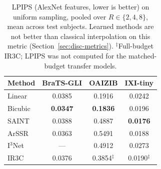 \begin{table}[pos=!htbp]
\caption{LPIPS (AlexNet features, lower is better) on uniform sampling, pooled over $R\in\{2,4,8\}$, mean across test subjects. Learned methods are not better than classical interpolation on this metric (Section~\ref{sec:disc-metrics}). $^{\ddagger}$Full-budget IR3C; LPIPS was not computed for the matched-budget transfer models.}
\label{tab:lpips}
\footnotesize\setlength{\tabcolsep}{3pt}
\begin{tabular*}{\columnwidth}{@{\extracolsep{\fill}}lccc@{}}
\toprule
Method & BraTS-GLI & OAIZIB & IXI-tiny \\
\midrule
Linear & 0.0385 & 0.1916 & 0.0242 \\
Bicubic & \textbf{0.0347} & \textbf{0.1836} & 0.0196 \\
SAINT & 0.0388 & 0.4887 & \textbf{0.0176} \\
ArSSR & 0.0363 & 0.5491 & 0.0188 \\
I$^3$Net & --- & 0.4912 & 0.0273 \\
IR3C & 0.0376 & 0.3854$^{\ddagger}$ & 0.0190$^{\ddagger}$ \\
\bottomrule
\end{tabular*}
\end{table}
